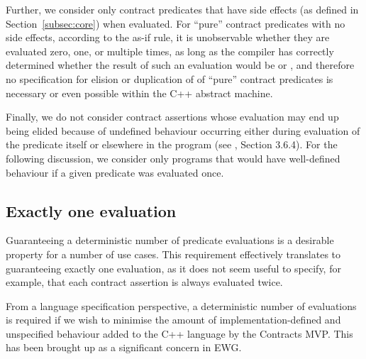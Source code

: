 Further, we consider only contract predicates that have side effects (as defined in Section~\ref{subsec:core}) when evaluated. For ``pure'' contract predicates with no side effects, according to the as-if rule, it is unobservable whether they are evaluated zero, one, or multiple times, as long as the compiler has correctly determined whether the result of such an evaluation would be  or , and therefore no specification for elision or duplication of of ``pure'' contract predicates is necessary or even possible within the C++ abstract machine.

Finally, we do not consider contract assertions whose evaluation may end up being elided because of undefined behaviour occurring either during evaluation of the predicate itself or elsewhere in the program (see \cite{P2900R6}, Section 3.6.4). For the following discussion, we consider only programs that would have well-defined behaviour if a given predicate was evaluated once.

\subsection{Exactly one evaluation}
\label{subsec:exactlyonce}
Guaranteeing a deterministic number of predicate evaluations is a desirable property for a number of use cases. This requirement effectively translates to guaranteeing exactly one evaluation, as it does not seem useful to specify, for example, that each contract assertion is always evaluated twice.

From a language specification perspective, a deterministic number of evaluations is required if we wish to minimise the amount of implementation-defined and unspecified behaviour added to the C++ language by the Contracts MVP. This has been brought up as a significant concern in EWG.

